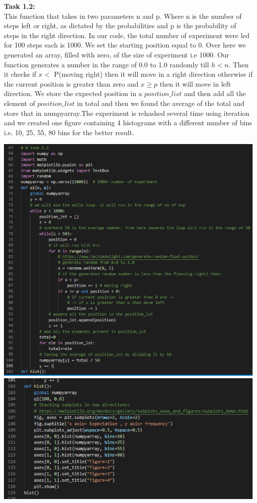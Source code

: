\documentclass[answers]{exam}
\begin{document}
\begin{framed}
\textbf{Task 1.2:\\}
This function that takes in two parameters n and p. Where n is the number of steps left or right, as dictated by the probabilities and p is the probability of steps in the right direction. In our code, the total number of experiment were led for 100 steps each is 1000. We set the starting position equal to 0. Over here we generated an array, filled with zero, of the size of experiment i.e 1000. Our function generates a number in the range of 0.0 to 1.0 randomly till $h<n$. Then it checks if $x <$ P(moving right) then it will move in a right direction otherwise if the current position is greater than zero and $x\geq p$ then it will move in left direction. We store the expected position in a $position\_list$ and then add all the element of $position\_list$ in total and then we found the average of the total and store that in numpyarray.The experiment is rehashed several time using iteration and we created one figure containing 4 histograms with a different number of bins i.e. 10, 25, 55, 80 bins for the better result.
\begin{center}
    \includegraphics[scale=0.7]{task1.2a.PNG}\\
    \includegraphics[scale=0.7]{task1.2b.PNG}

\end{center}
\end{framed}
\end{document}
